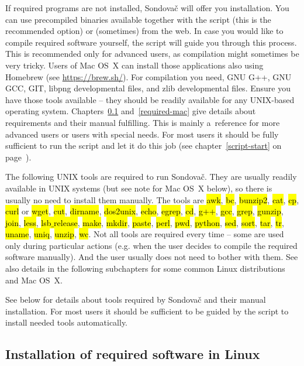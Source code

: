 \documentclass[a4paper, 11pt, twoside]{article}
\renewcommand{\texttt}[1]{\hl{\ttfamily #1}}
\begin{document}
If required programs are not installed, Sondovač will offer you installation. You can use precompiled binaries available together with the script (this is the recommended option) or (sometimes) from the web. In case you would like to compile required software yourself, the script will guide you through this process. This is recommended only for advanced users, as compilation might sometimes be very tricky. Users of Mac OS~X can install those applications also using Homebrew (see \url{https://brew.sh/}). For compilation you need, GNU G++, GNU GCC, GIT, libpng developmental files, and zlib developmental files. Ensure you have those tools available -- they should be readily available for any UNIX-based operating system. Chapters~\ref{required-linux} and~\ref{required-mac} give details about requirements and their manual fulfilling. This is mainly a~reference for more advanced users or users with special needs. For most users it should be fully sufficient to run the script and let it do this job (see chapter~\ref{script-start} on page~\pageref{script-usage}).

The following UNIX tools are required to run Sondovač. They are usually readily available in UNIX systems (but see note for Mac OS~X below), so there is usually no need to install them manually. The tools are \texttt{awk}, \texttt{bc}, \texttt{bunzip2}, \texttt{cat}, \texttt{cp}, \texttt{curl} or \texttt{wget}, \texttt{cut}, \texttt{dirname}, \texttt{dos2unix}, \texttt{echo}, \texttt{egrep}, \texttt{cd}, \texttt{g++}, \texttt{gcc}, \texttt{grep}, \texttt{gunzip}, \texttt{join}, \texttt{less}, \texttt{lsb$\_$release}, \texttt{make}, \texttt{mkdir}, \texttt{paste}, \texttt{perl}, \texttt{pwd}, \texttt{python}, \texttt{sed}, \texttt{sort}, \texttt{tar}, \texttt{tr}, \texttt{uname}, \texttt{uniq}, \texttt{unzip}, \texttt{wc}. Not all tools are required every time -- some are used only during particular actions (e.g. when the user decides to compile the required software manually). And the user usually does not need to bother with them. See also details in the following subchapters for some common Linux distributions and Mac OS~X.

See below for details about tools required by Sondovač and their manual installation. For most users it should be sufficient to be guided by the script to install needed tools automatically.

\subsection{Installation of required software in Linux}
\label{required-linux}
\end{document}
